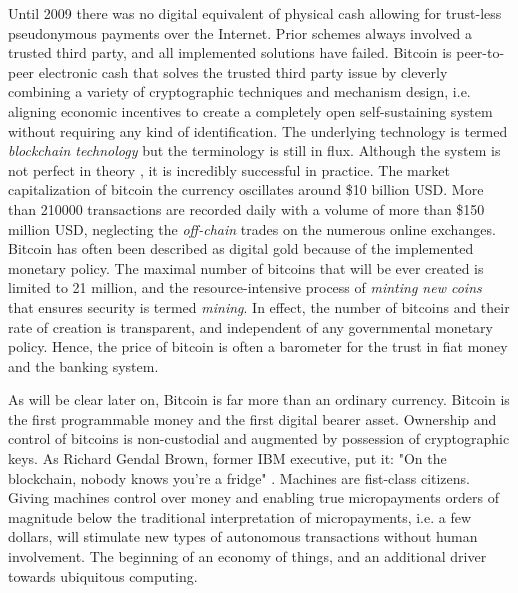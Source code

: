 Until 2009 there was no digital equivalent of physical cash allowing for trust-less pseudonymous payments over the Internet. Prior schemes always involved a trusted third party, and all implemented solutions have failed. Bitcoin is peer-to-peer electronic cash \parencite{nakamoto2008bitcoin} that solves the trusted third party issue by cleverly combining a variety of cryptographic techniques and mechanism design, i.e. aligning economic incentives to create a completely open self-sustaining system without requiring any kind of identification. The underlying technology is termed \emph{blockchain technology} but the terminology is still in flux. Although the system is not perfect in theory \parencite{Eyal2014}, it is incredibly successful in practice. The market capitalization of bitcoin the currency oscillates around \$10 billion USD. More than 210000 transactions are recorded daily with a volume of more than \$150 million USD, neglecting the \emph{off-chain} trades on the numerous online exchanges. Bitcoin has often been described as digital gold because of the implemented monetary policy. The maximal number of bitcoins that will be ever created is limited to 21 million, and the resource-intensive process of \emph{minting new coins} that ensures security is termed \emph{mining}. In effect, the number of bitcoins and their rate of creation is transparent, and independent of any governmental monetary policy. Hence, the price of bitcoin is often a barometer for the trust in fiat money and the banking system.

As will be clear later on, Bitcoin is far more than an ordinary currency. Bitcoin is the first programmable money and the first digital bearer asset. Ownership and control of bitcoins is non-custodial and augmented by possession of cryptographic keys. As Richard Gendal Brown, former IBM executive, put it: "On the blockchain, nobody knows you're a fridge" \parencite{brown2013}. Machines are fist-class citizens. Giving machines control over money and enabling true micropayments orders of magnitude below the traditional interpretation of micropayments, i.e. a few dollars, will stimulate new types of autonomous transactions without human involvement. The beginning of an economy of things, and an additional driver towards ubiquitous computing.

